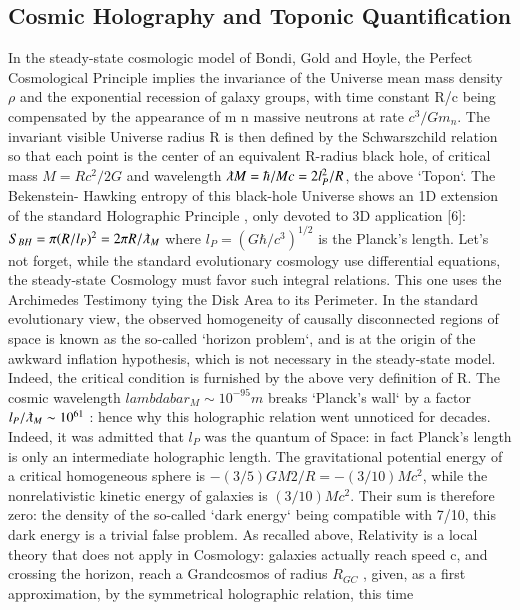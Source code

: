 \documentclass[twoside,draft]{article}
\begin{document}
\begin{sloppypar}
{\subsection{Cosmic Holography and Toponic Quantification}

In the steady-state cosmologic model of Bondi, Gold and Hoyle\cite{bondi}, the Perfect Cosmological
Principle implies the invariance of the Universe mean mass density $\rho$ and the exponential recession
of galaxy groups, with time constant R/c being compensated by the appearance of m n massive
neutrons at rate $c^{3} /Gm_{n}$. The invariant visible Universe radius R is then defined by the
Schwarszchild relation so that each point is the center of an equivalent R-radius black hole, of
critical mass $M = Rc^{2} /2G$ and wavelength $\lambdabar M = \hbar/Mc = 2l_{P}^{2} /R$, the above `Topon`. The Bekenstein-
Hawking entropy of this black-hole Universe shows an 1D extension of the standard Holographic
Principle , only devoted to 3D application \cite{bousso}[6]:
$S_{BH} = \pi(R/l_{P})^{2} = 2\pi R/\lambdabar_{M}$
where $l_{P} = (G\hbar/c^{3} )^{1/2}$ is the Planck's length. Let's not forget, while the standard evolutionary cosmology
use differential equations, the steady-state Cosmology must favor such integral relations. This one
uses the Archimedes Testimony tying the Disk Area to its Perimeter.
In the standard evolutionary view, the observed homogeneity of causally disconnected regions
of space is known as the so-called `horizon problem`, and is at the origin of the awkward inflation
hypothesis, which is not necessary in the steady-state model. Indeed, the critical condition is
furnished by the above very definition of R.
The cosmic wavelength
$lambdabar_{M} \sim 10^{-95} m$ breaks `Planck's wall` by a factor $l_{P} /\lambdabar_{M} \sim 10^{61}$ : hence why this holographic relation went unnoticed for decades. Indeed, it was admitted that $l_{P}$ was the quantum of Space: in fact Planck's length is only an intermediate holographic length.
The gravitational potential energy of a critical homogeneous sphere is $-(3/5)GM2/R = -
(3/10)Mc^{2}$, while the nonrelativistic kinetic energy of galaxies is $(3/10)Mc^{2}$. Their sum is therefore
zero: the density of the so-called `dark energy` being compatible with 7/10, this dark energy is a
trivial false problem. As recalled above, Relativity is a local theory that does not apply in
Cosmology: galaxies actually reach speed c, and crossing the horizon, reach a Grandcosmos of
radius $R_{GC}$ , given, as a first approximation, by the symmetrical holographic relation, this time
}
\end{sloppypar}
\end{document}
